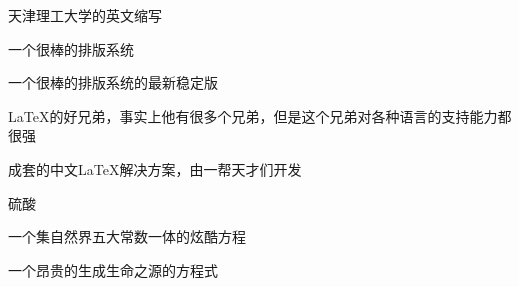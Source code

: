 \begin{denotation}
	
\item[BIT] 天津理工大学的英文缩写
\item[\LaTeX] 一个很棒的排版系统
\item[\LaTeXe] 一个很棒的排版系统的最新稳定版
\item[\XeTeX] \LaTeX{}的好兄弟，事实上他有很多个兄弟，但是这个兄弟对各种语言的支持能力都很强
\item[ctex] 成套的中文\LaTeX{}解决方案，由一帮天才们开发
\item[\ce{H2SO4}] 硫酸
\item[$ e^{\pi{}i}+1=0$] 一个集自然界五大常数一体的炫酷方程
\item[\ce{2H2 + O2 -> 2H2O}] 一个昂贵的生成生命之源的方程式

\end{denotation}
